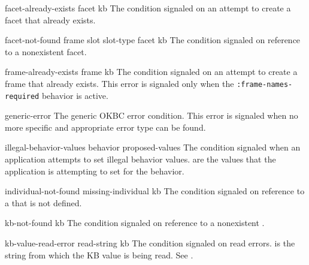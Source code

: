 \begin{okbccondition}{facet-already-exists}{ facet kb } {  }
The condition signaled on an attempt to create a facet that already 
    exists.
\end{okbccondition}

\begin{okbccondition}{facet-not-found}{ frame slot slot-type facet kb } {  }
The condition signaled on reference to a nonexistent facet.
\end{okbccondition}

\begin{okbccondition}{frame-already-exists}{ frame kb } {  }
The condition signaled on an attempt to create a frame that already 
    exists.  This error is signaled only when the
    {\tt :frame-names-required} behavior is active.
\end{okbccondition}

\begin{okbccondition}{generic-error}{  } {  }
The generic OKBC error condition.
   This error is signaled when no more specific and appropriate error type
   can be found.
\end{okbccondition}

\begin{okbccondition}{illegal-behavior-values}{ behavior proposed-values } {  }
The condition signaled when an application attempts to
   set illegal behavior values.   are the values
   that the application is attempting to set for the behavior.
\end{okbccondition}

\begin{okbccondition}{individual-not-found}{ missing-individual kb } {  }
The condition signaled on reference to a 
    that is not defined.
\end{okbccondition}

\begin{okbccondition}{kb-not-found}{ kb } {  }
The condition signaled on reference to a nonexistent .
\end{okbccondition}

\begin{okbccondition}{kb-value-read-error}{ read-string kb } {  }
The condition signaled on read errors.   is the string
    from which the KB value is being read.  See .
\end{okbccondition}


